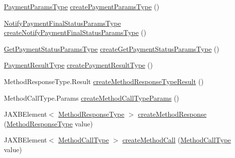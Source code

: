 \begin{DoxyCompactItemize}
\item 
\hyperlink{classcom_1_1telefonica_1_1schemas_1_1unica_1_1rpc_1_1payment_1_1v1_1_1PaymentParamsType}{PaymentParamsType} \hyperlink{classcom_1_1telefonica_1_1schemas_1_1unica_1_1rpc_1_1payment_1_1v1_1_1ObjectFactory_a47e8e3338fb8a26d13944391b4637818}{createPaymentParamsType} ()
\item 
\hyperlink{classcom_1_1telefonica_1_1schemas_1_1unica_1_1rpc_1_1payment_1_1v1_1_1NotifyPaymentFinalStatusParamsType}{NotifyPaymentFinalStatusParamsType} \hyperlink{classcom_1_1telefonica_1_1schemas_1_1unica_1_1rpc_1_1payment_1_1v1_1_1ObjectFactory_a7938dbdc1c031f9e338763fbc1b43f61}{createNotifyPaymentFinalStatusParamsType} ()
\item 
\hyperlink{classcom_1_1telefonica_1_1schemas_1_1unica_1_1rpc_1_1payment_1_1v1_1_1GetPaymentStatusParamsType}{GetPaymentStatusParamsType} \hyperlink{classcom_1_1telefonica_1_1schemas_1_1unica_1_1rpc_1_1payment_1_1v1_1_1ObjectFactory_a890a85d65865ff8d64b045a35700ade3}{createGetPaymentStatusParamsType} ()
\item 
\hyperlink{classcom_1_1telefonica_1_1schemas_1_1unica_1_1rpc_1_1payment_1_1v1_1_1PaymentResultType}{PaymentResultType} \hyperlink{classcom_1_1telefonica_1_1schemas_1_1unica_1_1rpc_1_1payment_1_1v1_1_1ObjectFactory_adf16a740451108aae2cad98632d084f7}{createPaymentResultType} ()
\item 
MethodResponseType.Result \hyperlink{classcom_1_1telefonica_1_1schemas_1_1unica_1_1rpc_1_1payment_1_1v1_1_1ObjectFactory_a131367bd27f79b2064ab50dc811de203}{createMethodResponseTypeResult} ()
\item 
MethodCallType.Params \hyperlink{classcom_1_1telefonica_1_1schemas_1_1unica_1_1rpc_1_1payment_1_1v1_1_1ObjectFactory_a071376c4fe6c60743c9b7cd701ad193e}{createMethodCallTypeParams} ()
\item 
JAXBElement$<$ \hyperlink{classcom_1_1telefonica_1_1schemas_1_1unica_1_1rpc_1_1payment_1_1v1_1_1MethodResponseType}{MethodResponseType} $>$ \hyperlink{classcom_1_1telefonica_1_1schemas_1_1unica_1_1rpc_1_1payment_1_1v1_1_1ObjectFactory_a41cf8fbb1c66658d09cc94c9e63dc846}{createMethodResponse} (\hyperlink{classcom_1_1telefonica_1_1schemas_1_1unica_1_1rpc_1_1payment_1_1v1_1_1MethodResponseType}{MethodResponseType} value)
\item 
JAXBElement$<$ \hyperlink{classcom_1_1telefonica_1_1schemas_1_1unica_1_1rpc_1_1payment_1_1v1_1_1MethodCallType}{MethodCallType} $>$ \hyperlink{classcom_1_1telefonica_1_1schemas_1_1unica_1_1rpc_1_1payment_1_1v1_1_1ObjectFactory_a0e356d76ebc4529d2256817ad0ad5452}{createMethodCall} (\hyperlink{classcom_1_1telefonica_1_1schemas_1_1unica_1_1rpc_1_1payment_1_1v1_1_1MethodCallType}{MethodCallType} value)
\end{DoxyCompactItemize}


